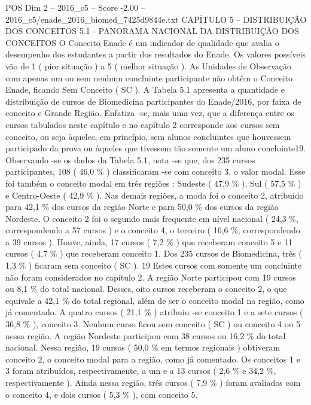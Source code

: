 \begin{textsample}{POS Dim 2 – 2016\_c5 – Score -2.00 – 2016\_c5/enade\_2016\_biomed\_7425d9844e.txt}  \label{ex:f2_pos_402}
CAPÍTULO 5 – DISTRIBUIÇÃO DOS CONCEITOS 5.1 - PANORAMA NACIONAL DA DISTRIBUIÇÃO DOS CONCEITOS O Conceito Enade é um indicador de qualidade que avalia o desempenho dos estudantes a partir dos resultados do Enade.
Os valores possíveis vão de 1 ( pior situação ) a 5 ( melhor situação ).
As Unidades de Observação com apenas um ou sem nenhum concluinte participante não obtêm o Conceito Enade, ficando Sem Conceito ( SC ).
A Tabela 5.1 apresenta a quantidade e distribuição de cursos de Biomedicina participantes do Enade/2016, por faixa de conceito e Grande Região.
Enfatiza -se, mais uma vez, que a diferença entre os cursos tabulados neste capítulo e no capítulo 2 corresponde aos cursos sem conceito, ou seja àqueles, em princípio, sem alunos concluintes que houvessem participado da prova ou àqueles que tivessem tão somente um aluno concluinte19.
Observando -se os dados da Tabela 5.1, nota -se que, dos 235 cursos participantes, 108 ( 46,0 \% ) classificaram -se com conceito 3, o valor modal.
Esse foi também o conceito modal em três regiões : Sudeste ( 47,9 \% ), Sul ( 57,5 \% ) e Centro-Oeste ( 42,9 \% ).
Nas demais regiões, a moda foi o conceito 2, atribuído para 42,1 \% dos cursos da região Norte e para 50,0 \% dos cursos da região Nordeste.
O conceito 2 foi o segundo mais frequente em nível nacional ( 24,3 \%, correspondendo a 57 cursos ) e o conceito 4, o terceiro ( 16,6 \%, correspondendo a 39 cursos ).
Houve, ainda, 17 cursos ( 7,2 \% ) que receberam conceito 5 e 11 cursos ( 4,7 \% ) que receberam conceito 1.
Dos 235 cursos de Biomedicina, três ( 1,3 \% ) ficaram sem conceito ( SC ). 19 Estes cursos com somente um concluinte não foram considerados no capítulo 2.
A região Norte participou com 19 cursos ou 8,1 \% do total nacional.
Desses, oito cursos receberam o conceito 2, o que equivale a 42,1 \% do total regional, além de ser o conceito modal na região, como já comentado.
A quatro cursos ( 21,1 \% ) atribuiu -se conceito 1 e a sete cursos ( 36,8 \% ), conceito 3.
Nenhum curso ficou sem conceito ( SC ) ou conceito 4 ou 5 nessa região.
A região Nordeste participou com 38 cursos ou 16,2 \% do total nacional.
Nessa região, 19 cursos ( 50,0 \% em termos regionais ) obtiveram conceito 2, o conceito modal para a região, como já comentado.
Os conceitos 1 e 3 foram atribuídos, respectivamente, a um e a 13 cursos ( 2,6 \% e 34,2 \%, respectivamente ).
Ainda nessa região, três cursos ( 7,9 \% ) foram avaliados com o conceito 4, e dois cursos ( 5,3 \% ), com conceito 5.

\end{textsample}
